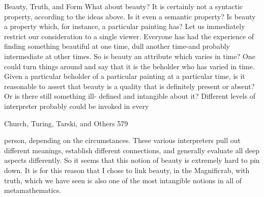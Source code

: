 {                              Beauty, Truth, and Form
What about beauty? It is certainly not a syntactic property, according to the ideas above.
Is it even a semantic property? Is beauty a property which, for instance, a particular
painting has? Let us immediately restrict our consideration to a single viewer. Everyone
has had the experience of finding something beautiful at one time, dull another time-and
probably intermediate at other times. So is beauty an attribute which varies in time? One
could turn things around and say that it is the beholder who has varied in time. Given a
particular beholder of a particular painting at a particular time, is it reasonable to assert
that beauty is a quality that is definitely present or absent? Or is there still something ill-
defined and intangible about it?
        Different levels of interpreter probably could be invoked in every




Church, Turing, Tarski, and Others                                                         579

person, depending on the circumstances. These various interpreters pull out different
meanings, establish different connections, and generally evaluate all deep aspects
differently. So it seems that this notion of beauty is extremely hard to pin down. It is for
this reason that I chose to link beauty, in the Magnificrab, with truth, which we have seen
is also one of the most intangible notions in all of metamathematics.

}
